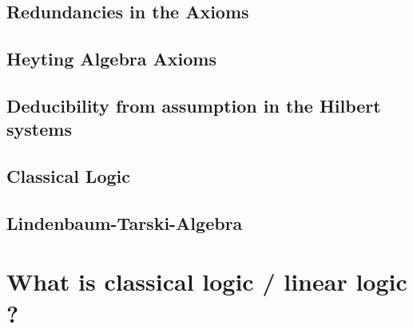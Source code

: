 	\subsection{Redundancies in the Axioms}
		
	\subsection{Heyting Algebra Axioms}
		
	\subsection{Deducibility from assumption in the Hilbert systems}
		
	\subsection{Classical Logic}
			
	\subsection{Lindenbaum-Tarski-Algebra}
		

\section{What is classical logic / linear logic ? }
		
		

 

